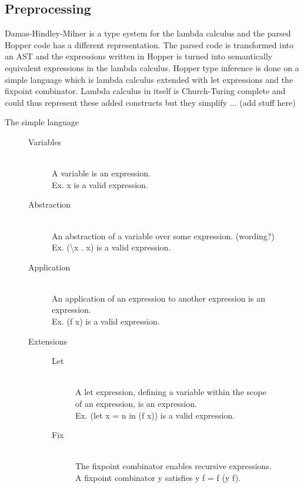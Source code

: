 \subsection{Preprocessing}

Damas-Hindley-Milner is a type system for the lambda calculus and the parsed Hopper code has a different representation. The parsed code is transformed into an AST and the expressions written in Hopper is turned into semantically equivalent expressions in the lambda calculus. Hopper type inference is done on a simple language which is lambda calculus extended with let expressions and the fixpoint combinator. Lambda calculus in itself is Church-Turing complete and could thus represent these added constructs but they simplify ... (add stuff here)

\begin{description}
\item[The simple language] \hfill
\begin{description}
  \item[Variables] \hfill \\
    A variable is an expression.\\
    Ex. x is a valid expression.
   \item[Abstraction] \hfill \\
    An abstraction of a variable over some expression. (wording?)\\
    Ex. (\textbackslash x . x) is a valid expression.
   \item[Application] \hfill \\
    An application of an expression to another expression is an expression.\\
    Ex. (f x) is a valid expression.
   \item[Extensions] \hfill
\begin{description}
    \item[Let] \hfill \\
      A let expression, defining a variable within the scope\\
      of an expression, is an expression.\\
      Ex. (let x = n in (f x)) is a valid expression. 
    \item[Fix] \hfill \\
      The fixpoint combinator enables recursive expressions.\\
      A fixpoint combinator y satisfies y f = f (y f).
\end{description}
\end{description}
\end{description}

